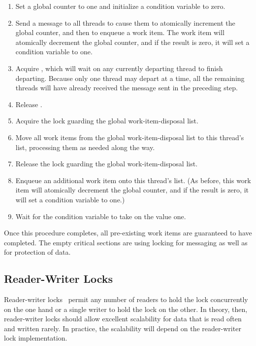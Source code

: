 {	\begin{enumerate}
	\item	Set a global counter to one and initialize a condition
		variable to zero.
	\item	Send a message to all threads to cause them to atomically
		increment the global counter, and then to enqueue a
		work item.
		The work item will atomically decrement the global
		counter, and if the result is zero, it will set a
		condition variable to one.
	\item	Acquire , which will wait on any currently departing
		thread to finish departing.
		Because only one thread may depart at a time, all the
		remaining threads will have already received the message
		sent in the preceding step.
	\item	Release .
	\item	Acquire the lock guarding the global work-item-disposal list.
	\item	Move all work items from the global work-item-disposal list
		to this thread's list, processing them as needed along the way.
	\item	Release the lock guarding the global work-item-disposal list.
	\item	Enqueue an additional work item onto this thread's list.
		(As before, this work item will atomically decrement
		the global counter, and if the result is zero, it will
		set a condition variable to one.)
	\item	Wait for the condition variable to take on the value one.
	\end{enumerate}

	Once this procedure completes, all pre-existing work items are
	guaranteed to have completed.
	The empty critical sections are using locking for messaging as
	well as for protection of data.
} \QuickQuizEnd

\subsection{Reader-Writer Locks}
\label{sec:locking:Reader-Writer Locks}

Reader-writer locks~\cite{Courtois71}
permit any number of readers to hold the lock
concurrently on the one hand or a single writer to hold the lock
on the other.
In theory, then, reader-writer locks should allow excellent scalability
for data that is read often and written rarely.
In practice, the scalability will depend on the reader-writer lock
implementation.

